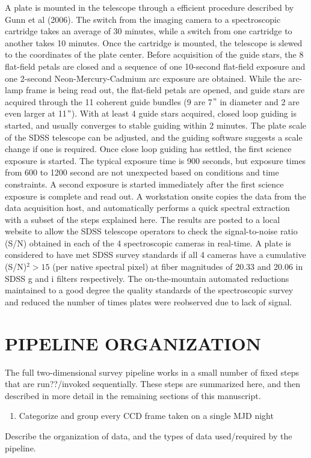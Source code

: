 \documentclass[12pt,preprint]{aastex}
\begin{document}
A plate is mounted in the telescope through a efficient procedure described
by Gunn et al (2006).  The switch from the imaging camera to a spectroscopic
cartridge takes an average of 30 minutes, while a switch from one cartridge
to another takes 10 minutes.  Once the cartridge is mounted, 
the telescope is slewed to the coordinates of the plate center.  
Before acquisition of the guide stars, the 8 flat-field petals are closed and
a sequence of one 10-second flat-field exposure and one 2-second 
Neon-Mercury-Cadmium arc exposure are obtained.  While the arc-lamp frame is
being read out, the flat-field petals are opened, and guide stars are acquired
through the 11 coherent guide bundles (9 are 7$"$ in diameter and 
2 are even larger at 11$"$).
With at least 4 guide stars acquired, closed loop guiding is started, and
usually converges to stable guiding within 2 minutes.
The plate scale of the SDSS telescope can be adjusted, and the guiding software
suggests a scale change if one is required.  Once close loop 
guiding has settled, the first science exposure is started.  The typical 
exposure time is 900 seconds, but exposure times from 600 to 1200 second are not
unexpected based on conditions and time constraints.  A second exposure is 
started immediately after the first science exposure is complete and read out.
A workstation onsite copies the data from the data acquisition host,
and automatically performs a quick spectral extraction with a subset of the 
steps explained here.  The results are posted to a local website to allow the 
SDSS telescope operators to check the signal-to-noise ratio (S/N) 
obtained in each of the 4 spectroscopic cameras in real-time.  
A plate is considered to have met SDSS survey standards
if all 4 cameras have a cumulative (S/N)$^2 > 15$ (per native spectral pixel) 
at fiber magnitudes of 20.33 and 20.06 in SDSS g and i filters respectively.  
The on-the-mountain automated reductions maintained to a good degree the quality
standards of the spectroscopic survey and reduced the number of times plates 
were reobserved due to lack of signal.

\section{PIPELINE ORGANIZATION}
\label{spplan}

The full two-dimensional survey pipeline works in a small number of fixed steps
that are run??/invoked sequentially.  These steps are summarized here, and then described in more detail in the remaining sections of this manuscript.
\begin{enumerate}
\item{Categorize and group every CCD frame taken on a single MJD night}
\end{enumerate} 
Describe the organization of data, and the types of data 
used/required by the pipeline.
\end{document}
